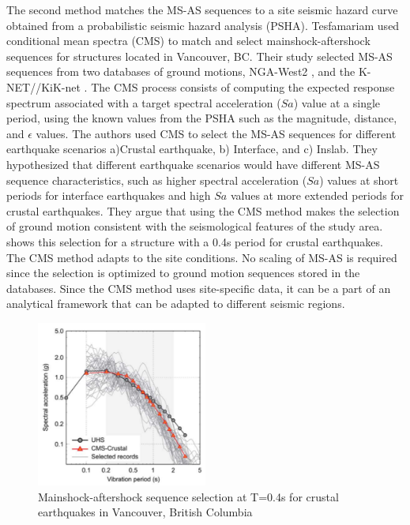 The second method matches the MS-AS sequences to a site seismic hazard curve obtained from a probabilistic seismic hazard analysis (PSHA). Tesfamariam \cite{Tesfamariam2015} used conditional mean spectra (CMS) to match and select mainshock-aftershock sequences for structures located in Vancouver, BC. Their study selected MS-AS sequences from two databases of ground motions, NGA-West2 \citep{Ancheta2014}, and the K-NET//KiK-net \cite{NIEDK-NETKiK-net2019}. The CMS process consists of computing the expected response spectrum associated with a target spectral acceleration ($Sa$) value at a single period, using the known values from the PSHA such as the magnitude, distance, and $\epsilon$ values. The authors used CMS to select the MS-AS sequences for different earthquake scenarios a)Crustal earthquake, b) Interface, and c) Inslab. They hypothesized that different earthquake scenarios would have different MS-AS sequence characteristics, such as higher spectral acceleration ($Sa$) values at short periods for interface earthquakes and high $Sa$ values at more extended periods for crustal earthquakes. They argue that using the CMS method makes the selection of ground motion consistent with the seismological features of the study area.  shows this selection for a structure with a 0.4s period for crustal earthquakes. The CMS method adapts to the site conditions. No scaling of MS-AS is required since the selection is optimized to ground motion sequences stored in the databases. Since the CMS method uses site-specific data, it can be a part of an analytical framework that can be adapted to different seismic regions.

\begin{figure}[htbp]
\centering
\includegraphics[width=0.5\textwidth]{Chapter-2/figs/CMS-Tesfamariam_MS-AS_seq}
\caption{Mainshock-aftershock sequence selection at T=0.4s for crustal earthquakes in Vancouver, British Columbia \cite{Tesfamariam2015}}
\label{fig:MS-AS_Goda}
\end{figure}


